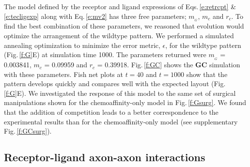 \documentclass[11pt, a4paper, draft]{article}
\begin{document}
The model defined by the receptor and ligand expressions of Eqs.\,\ref{e:retrcpt}
\& \ref{e:tecligexp} along with Eq.\,\ref{e:mv2} has three
free parameters; $m_{\!_G}$, $m_c$ and $r_c$. To find the best combination of
these parameters, we reasoned that evolution would optimize the arrangement of
the wildtype pattern. We performed a simulated annealing optimization to
minimize the error metric, $\epsilon$, for the wildtype pattern
(Fig.\,\ref{f:G}E) at simulation time 1000. The parameters returned were
$m_{\!_G}$ = 0.003841, $m_c$ = 0.09959 and $r_c$ = 0.39918. Fig.\,\ref{f:GC}
shows the $\mathbf{GC}$ simulation with these parameters. Fish net plots at
$t=40$ and $t=1000$ show that the pattern develops quickly and compares well
with the expected layout (Fig.\,\ref{f:G}E). We investigated the response of
this model to the same set of surgical manipulations shown for the
chemoaffinity-only model in Fig.\,\ref{f:Gsurg}. We found that the addition of
competition leads to a better correspondence to the experimental results than
for the chemoaffinity-only model (see supplementary Fig.\,\ref{f:GCsurg}).

\subsection*{Receptor-ligand axon-axon interactions}
\end{document}
